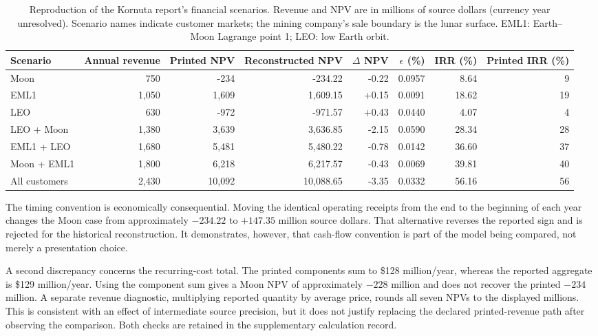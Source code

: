 \documentclass[final,5p,times,twocolumn]{elsarticle}
\begin{document}
\begin{table}[t]
\caption{Reproduction of the Kornuta report's financial scenarios. Revenue and NPV are in millions of source dollars (currency year unresolved). Scenario names indicate customer markets; the mining company's sale boundary is the lunar surface. EML1: Earth--Moon Lagrange point 1; LEO: low Earth orbit.}
\label{tab:kornuta}\centering\small
\begin{tabular}{@{}lrrrrrrr@{}}\toprule
Scenario & Annual revenue & Printed NPV & Reconstructed NPV & $\Delta$ NPV & $\epsilon$ (\%) & IRR (\%) & Printed IRR (\%) \\
\midrule
Moon & 750 & -234 & -234.22 & -0.22 & 0.0957 & 8.64 & 9 \\
EML1 & 1,050 & 1,609 & 1,609.15 & +0.15 & 0.0091 & 18.62 & 19 \\
LEO & 630 & -972 & -971.57 & +0.43 & 0.0440 & 4.07 & 4 \\
LEO + Moon & 1,380 & 3,639 & 3,636.85 & -2.15 & 0.0590 & 28.34 & 28 \\
EML1 + LEO & 1,680 & 5,481 & 5,480.22 & -0.78 & 0.0142 & 36.60 & 37 \\
Moon + EML1 & 1,800 & 6,218 & 6,217.57 & -0.43 & 0.0069 & 39.81 & 40 \\
All customers & 2,430 & 10,092 & 10,088.65 & -3.35 & 0.0332 & 56.16 & 56 \\
\bottomrule\end{tabular}\end{table}

The timing convention is economically consequential. Moving the identical operating receipts from the end to the beginning of each year changes the Moon case from approximately $-234.22$ to $+147.35$ million source dollars. That alternative reverses the reported sign and is rejected for the historical reconstruction. It demonstrates, however, that cash-flow convention is part of the model being compared, not merely a presentation choice.

A second discrepancy concerns the recurring-cost total. The printed components sum to \$128 million/year, whereas the reported aggregate is \$129 million/year. Using the component sum gives a Moon NPV of approximately $-228$ million and does not recover the printed $-234$ million. A separate revenue diagnostic, multiplying reported quantity by average price, rounds all seven NPVs to the displayed millions. This is consistent with an effect of intermediate source precision, but it does not justify replacing the declared printed-revenue path after observing the comparison. Both checks are retained in the supplementary calculation record.
\end{document}
